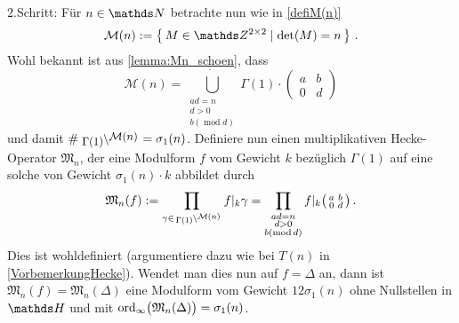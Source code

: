 \begin{bewe}
2.Schritt: Für $n \in \NN$ betrachte nun wie in \autoref{defiM(n)}
\[
\mathcal{M}(n) := \Set{M \in \ZZ^{2 \times 2} \mid \det (M) = n}
\,.
\]
Wohl bekannt ist aus \autoref{lemma:Mn_schoen}, dass 
\[
\mathcal{M}(n) = \dot{\bigcup_{\substack{ad = n\\ d > 0\\
b (\operatorname{mod} d)}}} \Gamma(1) \cdot 
\begin{pmatrix}
a & b\\
0 & d
\end{pmatrix}
\]
und damit $\# \linksmodulo{\Gamma(1)}{\mathcal{M}(n)} = \sigma_1(n)$. Definiere nun einen \glqq{}multiplikativen Hecke-Operator\grqq{} $\mathfrak{M}_n$, der eine Modulform $f$ vom Gewicht $k$ bezüglich $\Gamma(1)$ auf eine solche von Gewicht $\sigma_1 (n) \cdot k$ abbildet durch
\begin{equation}
\label{Gl 1}
\mathfrak{M}_n (f) := \prod_{\gamma \in \linksmodulo{\Gamma(1)}{\mathcal M(n)}} f |_k \gamma = \prod_{\substack{ad = n\\ d > 0\\b (\operatorname{mod} d)}} f |_k \mymat{a}{b}{0}{d}
\,.
\end{equation}
Dies ist wohldefiniert (argumentiere dazu wie bei $T(n)$ in \autoref{VorbemerkungHecke}). Wendet man dies nun auf $f = \Delta$ an, dann ist $\mathfrak{M}_n(f) = \mathfrak{M}_n(\Delta)$ eine Modulform vom Gewicht $12 \sigma_1(n)$ ohne Nullstellen in $\HH$ und mit $\operatorname{ord}_\infty \bigl( \mathfrak{M}_n(\Delta) \bigr) = \sigma_1(n)$.


\end{bewe}
